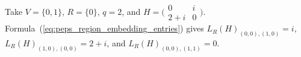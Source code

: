 \begin{example}
    Take $V=\{0,1\}$, $R=\{0\}$, $q=2$, and
    $H=\bigl(\begin{smallmatrix}0&i\\2+i&0\end{smallmatrix}\bigr)$.
    Formula~(\ref{eq:peps_region_embedding_entries}) gives
    $L_R(H)_{(0,0),(1,0)}=i$,
    $L_R(H)_{(1,0),(0,0)}=2+i$, and
    $L_R(H)_{(0,0),(1,1)}=0$.
\end{example}
